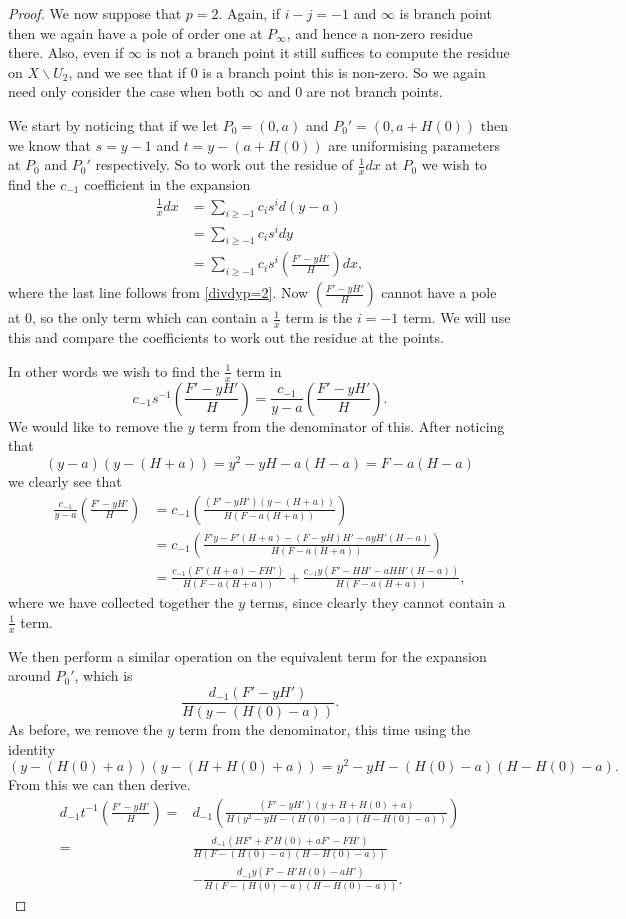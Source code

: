 \documentclass[draft, 11pt]{article} %
\theoremstyle{plain}
\theoremstyle{remark}
\begin{document}
\begin{proof}
We now suppose that $p=2$.
Again, if $i-j=-1$ and $\infty$ is branch point then we again have a pole of order one at $P_\infty$, and hence a non-zero residue there.
Also, even if $\infty$ is not a branch point it still suffices to compute the residue on $X\backslash U_2$, and we see that if $0$ is a branch point this is non-zero.
So we again need only consider the case when both $\infty$ and $0$ are not branch points.

We start by noticing that if we let $P_0 = (0,a)$ and $P_0' = (0,a+H(0))$ then we know that $s=y-1$ and $t=y-(a+H(0))$ are uniformising parameters at $P_0$ and $P_0'$ respectively.
So to work out the residue of $\frac{1}{x}dx$ at $P_0$ we wish to find the $c_{-1}$ coefficient in the expansion
\begin{align*}
\frac{1}{x}dx & = \sum_{i \geq -1} c_i s^i d(y-a) \\
& = \sum_{i\geq -1} c_i s^i dy \\
& = \sum_{i \geq -1} c_i s^i \left(\frac{F' - yH'}{H} \right) dx,
\end{align*}
where the last line follows from \eqref{divdyp=2}.
Now $\left(\frac{F' -yH'}{H}\right)$ cannot have a pole at $0$, so the only term which can contain a $\frac{1}{x}$ term is the $i=-1$ term.
We will use this and compare the coefficients to work out the residue at the points. 

In other words we wish to find the $\frac{1}{x}$ term in 
\[
c_{-1}s^{-1}\left(\frac{F' - yH'}{H} \right) = \frac{c_{-1}}{y-a} \left( \frac{F' - yH'}{H} \right).
\]
We would like to remove the $y$ term from the denominator of this.
After noticing that 
\[
(y-a)(y-(H+a)) = y^2 - yH - a(H-a) = F- a(H-a)
\]
we clearly see that 
\begin{align*}
\frac{c_{-1}}{y-a} \left( \frac{F' - yH'}{H} \right) & = c_{-1} \left( \frac{(F'-yH')(y-(H+a))}{H(F-a(H+a))} \right) \\
& = c_{-1} \left( \frac{F'y - F'(H+a) - (F -yH)H' - ayH'(H-a)}{H(F-a(H+a))} \right) \\
& = \frac{c_{-1}(F'(H+a) - FH')}{H(F-a(H+a))} + \frac{c_{-1}y(F' - HH' - aHH'(H-a))}{H(F-a(H+a))},
\end{align*}
where we have collected together the $y$ terms, since clearly they cannot contain a $\frac{1}{x}$ term.

We then perform a similar operation on the equivalent term for the expansion around $P_0'$, which is
\[
\frac{d_{-1}(F' - yH')}{H(y - (H(0) - a))}.
\]
As before, we remove the $y$ term from the denominator, this time using the identity
\[
(y-(H(0)+a))(y - (H+H(0)+a)) = y^2 - yH - (H(0) - a)(H - H(0) - a).
\]
From this we can then derive. 
\begin{align*}
d_{-1}t^{-1} \left( \frac{F' - yH'}{H} \right)  = & d_{-1}\left( \frac{(F'  - yH')(y+ H + H(0) + a)}{H(y^2 - yH -(H(0)-a)(H - H(0) -a ))} \right) \\
 =&  \frac{d_{-1}(HF' + F'H(0) + aF' - FH')}{H(F-(H(0) - a)(H - H(0) - a))}  \\
& - \frac{d_{-1}y(F' - H'H(0) - aH')}{H(F - (H(0) - a)( H - H(0) - a))}.
\end{align*}




\end{proof}
\end{document}
